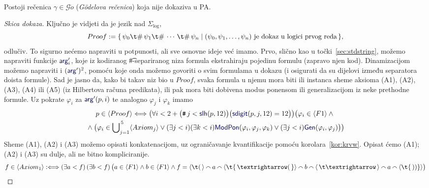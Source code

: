 \begin{teorem}[{name=[Gödelov prvi teorem nepotpunosti]}]\label{tm:goedel}
Postoji rečenica $\gamma\in\mathscr G\ddot o$ (\emph{Gödelova rečenica}) koja nije dokaziva u PA\@.
\end{teorem}
\begin{proof}[Skica dokaza]
Ključno je vidjeti da je jezik nad $\Sigma_{\log}$,
\begin{equation}
    Proof:=\{\,\psi_0\t\#\,\psi_1\t\#\,\dotsb\,\t\#\,\psi_n\mid (\psi_0,\psi_1,\dots,\psi_n)\text{ je dokaz u logici prvog reda}\,\}\text,
\end{equation}
	odlučiv\!. To sigurno nećemo napraviti u potpunosti, ali sve osnovne ideje već imamo. Prvo, slično kao u točki~\ref{sec:stdstring}, možemo napraviti funkcije $\f{arg}'_i$, koje iz kodiranog \t\#-separiranog niza formula ekstrahiraju pojedinu formulu (zapravo njen kod). Dinamizacijom možemo napraviti i $(\f{arg}')^2$, pomoću koje onda možemo govoriti o svim formulama u dokazu (i osigurati da su dijelovi između separatora doista formule). Sad je jasno da, kako bi takav niz bio u $Proof$, svaka formula u njemu mora biti ili instanca sheme aksioma (A1), (A2), (A3), (A4) ili (A5) (iz Hilbertova računa predikata), ili pak mora biti dobivena modus ponensom ili generalizacijom iz neke prethodne formule. Uz pokrate $\varphi_i$ za $\f{arg}'(p,i)$ te analogno $\varphi_j$ i $\varphi_k$ imamo
\begin{multline*}
	p\in\langle Proof\rangle\Longleftrightarrow\bigl(\forall i<2+\bigl(\num j<\f{slh}(p,12)\bigr)\bigl(\f{sdigit}(p,j,12)=12\bigr)\bigr)\bigl(\varphi_i\in\kr{F1}\land{}\\{}\land\bigl(
	\varphi_i\in\bigcup\nolimits_{j=1}^{\,5}\kr{Axiom_j}\lor(\exists j<i)(\exists k<i)\f{ModPon}(\varphi_i,\varphi_j,\varphi_k)\lor(\exists j<i)\f{Gen}(\varphi_i,\varphi_j)\bigr)\bigr)
\end{multline*}
	Sheme (A1), (A2) i (A3) možemo opisati konkatenacijom, uz ograničavanje kvantifikacije pomoću korolara~\ref{kor:krvw}. Opisat ćemo (A1); (A2) i (A3) su dulje, ali ne bitno kompliciranije.
\begin{equation*}
	f\in\kr{Axiom_1}:\Longleftrightarrow(\exists a<f)\,(\exists b<f)\,\bigl(a\in\kr{F1}\land b\in\kr{F1}\land f=\langle\t(\,\rangle\conc{}a\conc{}\langle\t{\,\textrightarrow(\,}\rangle\conc{}b\conc{}\langle\,\t\textrightarrow\,\rangle\conc{}a\conc{}\langle\t{\,))}\rangle\bigr)
\end{equation*}


\end{proof}
